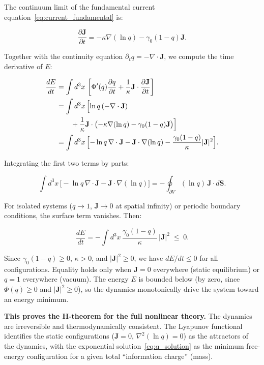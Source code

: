 \documentclass[aps,prd,twocolumn,showpacs,superscriptaddress,preprintnumbers]{revtex4-2}
\begin{document}
The continuum limit of the fundamental current equation~\eqref{eq:current_fundamental} is:

\begin{equation}
\frac{\partial \mathbf{J}}{\partial t} = -\kappa\nabla(\ln q) - \gamma_0(1-q)\mathbf{J}.
\label{eq:J_continuum}
\end{equation}

Together with the continuity equation $\partial_t q = -\nabla\cdot\mathbf{J}$, we compute the time derivative of $E$:

\begin{align}
\frac{dE}{dt} &= \int d^3x\,\left[\Phi'(q)\frac{\partial q}{\partial t} + \frac{1}{\kappa}\mathbf{J}\cdot\frac{\partial\mathbf{J}}{\partial t}\right] \nonumber \\
&= \int d^3x\,\Bigl[\ln q\,(-\nabla\cdot\mathbf{J}) \nonumber \\
&\qquad + \frac{1}{\kappa}\mathbf{J}\cdot\bigl(-\kappa\nabla(\ln q) - \gamma_0(1-q)\mathbf{J}\bigr)\Bigr] \nonumber \\
&= \int d^3x\,\Bigl[-\ln q\,\nabla\cdot\mathbf{J} - \mathbf{J}\cdot\nabla(\ln q) - \frac{\gamma_0(1-q)}{\kappa}|\mathbf{J}|^2\Bigr].
\label{eq:dEdt_step1}
\end{align}

Integrating the first two terms by parts:

\begin{equation}
\int d^3x\,\bigl[-\ln q\,\nabla\cdot\mathbf{J} - \mathbf{J}\cdot\nabla(\ln q)\bigr] = -\oint_{\partial V} (\ln q)\,\mathbf{J}\cdot d\mathbf{S}.
\label{eq:boundary_term}
\end{equation}

For isolated systems ($q\to1$, $\mathbf{J}\to0$ at spatial infinity) or periodic boundary conditions, the surface term vanishes.
Then:

\begin{equation}
\boxed{\frac{dE}{dt} = -\int d^3x\,\frac{\gamma_0(1-q)}{\kappa}\,|\mathbf{J}|^2 \;\leq\; 0}.
\label{eq:dEdt_final}
\end{equation}

Since $\gamma_0(1-q)\geq0$, $\kappa>0$, and $|\mathbf{J}|^2\geq0$, we have $dE/dt\leq0$ for all configurations.
Equality holds only when $\mathbf{J}=0$ everywhere (static equilibrium) or $q=1$ everywhere (vacuum).
The energy $E$ is bounded below (by zero, since $\Phi(q)\geq0$ and $|\mathbf{J}|^2\geq0$), so the dynamics monotonically drive the system toward an energy minimum.

\textbf{This proves the H-theorem for the full nonlinear theory.}
The dynamics are irreversible and thermodynamically consistent.
The Lyapunov functional identifies the static configurations ($\mathbf{J}=0$, $\nabla^2(\ln q)=0$) as the attractors of the dynamics, with the exponential solution~\eqref{eq:q_solution} as the minimum free-energy configuration for a given total ``information charge'' (mass).
\end{document}
